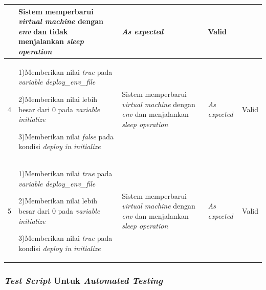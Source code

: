 \begin{longtable}{|P{.06\textwidth}|P{.30\textwidth}|P{.30\textwidth}|P{.10\textwidth}|P{.08\textwidth}|}
                                             & Sistem memperbarui
                                               \emph{virtual machine} dengan \emph{env} dan tidak menjalankan
                                               \emph{sleep operation} & \emph{As expected} & Valid \\\hline
  4 & 1)Memberikan nilai \emph{true} pada \emph{variable deploy\_env\_file} \par\null\par
      2)Memberikan nilai lebih besar dari 0 pada \emph{variable initialize} \par\null\par
      3)Memberikan nilai \emph{false} pada kondisi \emph{deploy in initialize}
                                             & Sistem memperbarui
                                               \emph{virtual machine} dengan \emph{env} dan menjalankan
                                               \emph{sleep operation} & \emph{As expected} & Valid \\\hline
  5 & 1)Memberikan nilai \emph{true} pada \emph{variable deploy\_env\_file} \par\null\par
      2)Memberikan nilai lebih besar dari 0 pada \emph{variable initialize} \par\null\par
      3)Memberikan nilai \emph{true} pada kondisi \emph{deploy in initialize}
                                             & Sistem memperbarui
                                               \emph{virtual machine} dengan \emph{env} dan menjalankan
                                               \emph{sleep operation} & \emph{As expected} & Valid \\\hline
\end{longtable}


\subsubsection{\emph{Test Script} Untuk \emph{Automated Testing}}

